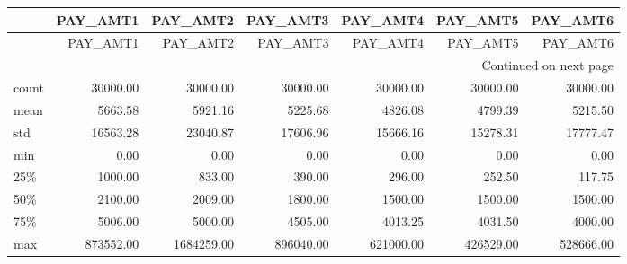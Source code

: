 \begin{longtable}{lrrrrrr}
\toprule
{} &  PAY\_AMT1 &   PAY\_AMT2 &  PAY\_AMT3 &  PAY\_AMT4 &  PAY\_AMT5 &  PAY\_AMT6 \\
\midrule
\endfirsthead

\toprule
{} &  PAY\_AMT1 &   PAY\_AMT2 &  PAY\_AMT3 &  PAY\_AMT4 &  PAY\_AMT5 &  PAY\_AMT6 \\
\midrule
\endhead
\midrule
\multicolumn{7}{r}{{Continued on next page}} \\
\midrule
\endfoot

\bottomrule
\endlastfoot
count &  30000.00 &   30000.00 &  30000.00 &  30000.00 &  30000.00 &  30000.00 \\
mean  &   5663.58 &    5921.16 &   5225.68 &   4826.08 &   4799.39 &   5215.50 \\
std   &  16563.28 &   23040.87 &  17606.96 &  15666.16 &  15278.31 &  17777.47 \\
min   &      0.00 &       0.00 &      0.00 &      0.00 &      0.00 &      0.00 \\
25\%   &   1000.00 &     833.00 &    390.00 &    296.00 &    252.50 &    117.75 \\
50\%   &   2100.00 &    2009.00 &   1800.00 &   1500.00 &   1500.00 &   1500.00 \\
75\%   &   5006.00 &    5000.00 &   4505.00 &   4013.25 &   4031.50 &   4000.00 \\
max   & 873552.00 & 1684259.00 & 896040.00 & 621000.00 & 426529.00 & 528666.00 \\
\end{longtable}
